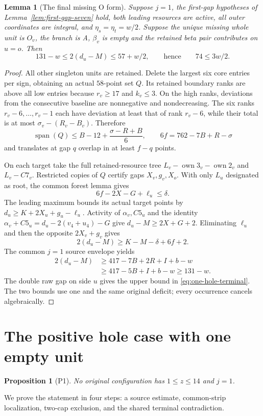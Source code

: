 \documentclass[11pt,letterpaper]{article}
\newcommand{\own}{\operatorname{own}}
\newtheorem{lemma}[theorem]{Lemma}
\newtheorem{proposition}[theorem]{Proposition}
\theoremstyle{definition}\newtheorem{definition}[theorem]{Definition}
\begin{document}
\begin{lemma}[The final missing O form]\label{lem:one-hole-terminal}
Suppose $j=1$, the first-gap hypotheses of Lemma~\ref{lem:first-gap-seven} hold, both leading resources are active, all outer coordinates are integral, and $\eta_s=\eta_t=w/2$. Suppose the unique missing whole unit is $O_v$, the branch is A, $\beta_v$ is empty and the retained beta pair contributes on $u=o$. Then
\begin{equation}\label{eq:one-hole-terminal}
131-w\le2(d_u-M)\le57+w/2,
\qquad\text{hence}\qquad74\le3w/2.
\end{equation}
\end{lemma}
\begin{proof}
All other singleton units are retained. Delete the largest six core entries per sign, obtaining an actual $58$-point set $Q$. Its retained boundary ranks are above all low entries because $r_v\ge17$ and $k_v\le3$. On the high ranks, deviations from the consecutive baseline are nonnegative and nondecreasing. The six ranks $r_v-6,\ldots,r_v-1$ each have deviation at least that of rank $r_v-6$, while their total is at most $\sigma_v-(R_v-B_v)$. Therefore
\[
\operatorname{span}(Q)\le B-12+\frac{\sigma-R+B}{6},\qquad
6f=762-7B+R-\sigma
\]
and translates at gap $q$ overlap in at least $f-q$ points.

On each target take the full retained-resource tree
$L_v-\own3_v-\own2_v$ and $L_v-C7_v$. Restricted copies of $Q$ certify gaps $X_v,g_v,X_o$. With only $L_u$ designated as root, the common forest lemma gives
\[
6f-2X-G+\ell_u\le\delta.
\]
The leading maximum bounds its actual target points by
$d_u\ge K+2X_u+g_u-\ell_u$. Activity of $\alpha_v,C5_u$ and the identity
$\alpha_v+C5_u=d_u-2(v_4+u_4)-G$ give $d_u-M\ge2X+G+2$.
Eliminating $\ell_u$ and then the opposite $2X_v+g_v$ gives
\[
2(d_u-M)\ge K-M-\delta+6f+2.
\]
The common $j=1$ source envelope yields
\[
\begin{aligned}
2(d_u-M)&\ge417-7B+2R+I+b-w\\
&\ge417-5B+I+b-w\ge131-w.
\end{aligned}
\]
The double raw gap on side $u$ gives the upper bound in \eqref{eq:one-hole-terminal}. The two bounds use one and the same original deficit; every occurrence cancels algebraically.
\end{proof}


\section{The positive hole case with one empty unit}\label{sec:p1}
\begin{proposition}[P1]\label{prop:p1}
No original configuration has $1\le z\le14$ and $j=1$.
\end{proposition}
We prove the statement in four steps: a source estimate, common-strip localization, two-cap exclusion, and the shared terminal contradiction.
\end{document}
